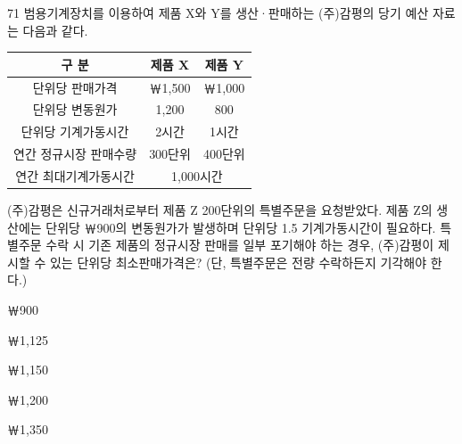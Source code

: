 \begin{question}{71}
범용기계장치를 이용하여 제품 X와 Y를 생산·판매하는 (주)감평의 당기 예산 자료는 다음과 같다.
\par{\small\centering\begin{tabular}{|c|c|c|}\hline
구 분 & 제품 X & 제품 Y \\ \hline
단위당 판매가격 & ￦1,500 & ￦1,000 \\ \hline
단위당 변동원가 & 1,200 & 800 \\ \hline
단위당 기계가동시간 & 2시간 & 1시간 \\ \hline
연간 정규시장 판매수량 & 300단위 & 400단위 \\ \hline
연간 최대기계가동시간 & \multicolumn{2}{c|}{1,000시간} \\ \hline
\end{tabular}\par}
(주)감평은 신규거래처로부터 제품 Z 200단위의 특별주문을 요청받았다. 제품 Z의 생산에는 단위당 ￦900의 변동원가가 발생하며 단위당 1.5 기계가동시간이 필요하다. 특별주문 수락 시 기존 제품의 정규시장 판매를 일부 포기해야 하는 경우, (주)감평이 제시할 수 있는 단위당 최소판매가격은? (단, 특별주문은 전량 수락하든지 기각해야 한다.)
\begin{choices}
  \item ￦900
  \item ￦1,125
  \item ￦1,150
  \item ￦1,200
  \item ￦1,350
\end{choices}
\end{question}
